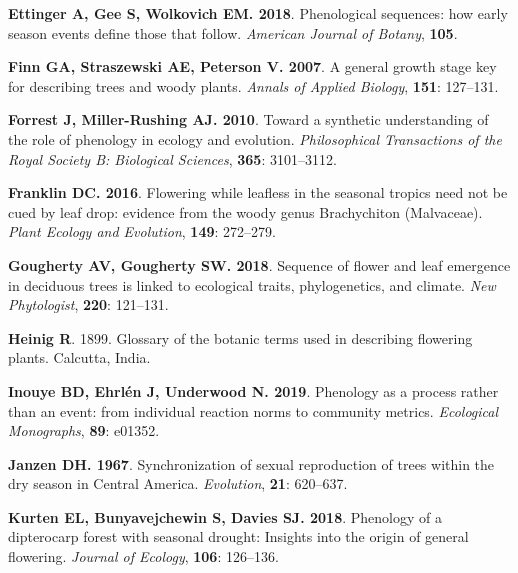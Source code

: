 \documentclass[11pt]{article}
\begin{document}
\begin{thebibliography}{39}
{\bf Ettinger A, Gee S, Wolkovich EM}{\bf . 2018}.
\newblock Phenological sequences: how early season events define those that
  follow.
\newblock \emph{American Journal of Botany}, {\bf 105}.

{\bf Finn GA, Straszewski AE, Peterson V}{\bf . 2007}.
\newblock A general growth stage key for describing trees and woody plants.
\newblock \emph{Annals of Applied Biology}, {\bf 151}: 127--131.

{\bf Forrest J, Miller-Rushing AJ}{\bf . 2010}.
\newblock Toward a synthetic understanding of the role of phenology in ecology
  and evolution.
\newblock \emph{Philosophical Transactions of the Royal Society B: Biological
  Sciences}, {\bf 365}: 3101--3112.

{\bf Franklin DC}{\bf . 2016}.
\newblock Flowering while leafless in the seasonal tropics need not be cued by
  leaf drop: evidence from the woody genus Brachychiton (Malvaceae).
\newblock \emph{Plant Ecology and Evolution}, {\bf 149}: 272--279.

{\bf Gougherty AV, Gougherty SW}{\bf . 2018}.
\newblock Sequence of flower and leaf emergence in deciduous trees is linked to
  ecological traits, phylogenetics, and climate.
\newblock \emph{New Phytologist}, {\bf 220}: 121--131.

{\bf Heinig R}. 1899.
\newblock Glossary of the botanic terms used in describing flowering plants.
\newblock Calcutta, India.

{\bf Inouye BD, Ehrl{\'e}n J, Underwood N}{\bf . 2019}.
\newblock Phenology as a process rather than an event: from individual reaction
  norms to community metrics.
\newblock \emph{Ecological Monographs}, {\bf 89}: e01352.

{\bf Janzen DH}{\bf . 1967}.
\newblock Synchronization of sexual reproduction of trees within the dry season
  in Central America.
\newblock \emph{Evolution}, {\bf 21}: 620--637.

{\bf Kurten EL, Bunyavejchewin S, Davies SJ}{\bf . 2018}.
\newblock Phenology of a dipterocarp forest with seasonal drought: Insights
  into the origin of general flowering.
\newblock \emph{Journal of Ecology}, {\bf 106}: 126--136.


\end{thebibliography}
\end{document}
